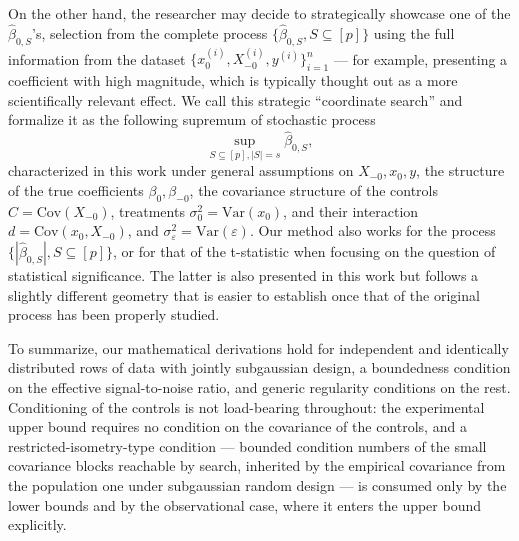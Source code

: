 On the other hand, the researcher may decide to strategically showcase one of the $\hat \beta_{0, S}$'s, selection from the complete process $\{\hat \beta_{0, S}, S \subseteq [p] \}$ using the full information from the dataset $\{x^{(i)}_0, {X^{(i)}_{-0}}, y^{(i)}\}_{i = 1}^n$ --- for example, presenting a coefficient with high magnitude, which is typically thought out as a more scientifically relevant effect. 
We call this strategic ``coordinate search'' and formalize it as the following supremum of stochastic process
\begin{equation}
        \sup_{S \subseteq [p], |S| = s} \hat \beta_{0, S},
\end{equation}
characterized in this work under general assumptions on $X_{-0}, x_0, y$, the structure of the true coefficients $\beta_0, \beta_{-0}$, the covariance structure of the controls $C = \text{Cov}(X_{-0})$, treatments $\sigma_0^2 = \text{Var}(x_{0})$, and their interaction $d = \text{Cov}(x_0, X_{-0})$, and $\sigma_\varepsilon^2 = \text{Var}(\varepsilon)$. Our method also works for the process $\{|\hat \beta_{0, S}|, S \subseteq [p]\}$, or for that of the t-statistic when focusing on the question of statistical significance. The latter is also presented in this work but follows a slightly different geometry that is easier to establish once that of the original process has been properly studied.

To summarize, our mathematical derivations hold for independent and identically distributed rows of data with jointly subgaussian design, a boundedness condition on the effective signal-to-noise ratio, and generic regularity conditions on the rest. Conditioning of the controls is not load-bearing throughout: the experimental upper bound requires no condition on the covariance of the controls, and a restricted-isometry-type condition --- bounded condition numbers of the small covariance blocks reachable by search, inherited by the empirical covariance from the population one under subgaussian random design --- is consumed only by the lower bounds and by the observational case, where it enters the upper bound explicitly.

